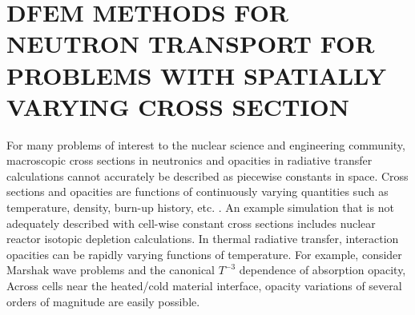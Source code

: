 %
%
%



\chapter{\uppercase{DFEM Methods for Neutron Transport for Problems with Spatially Varying Cross Section}}
\label{sec:chapter3_variable_xs}

For many problems of interest to the nuclear science and engineering community, macroscopic cross sections in neutronics and opacities in radiative transfer calculations cannot accurately be described as piecewise constants in space.  
Cross sections and opacities are functions of continuously varying quantities such as temperature, density, burn-up history, etc. \cite{xs_are_T_dependent}.
An example simulation that is not adequately described with cell-wise constant cross sections includes nuclear reactor isotopic depletion calculations.
In thermal radiative transfer, interaction opacities can be rapidly varying functions of temperature.  
For example, consider Marshak wave problems and the canonical $T^{-3}$ dependence \cite{ober_shadid} of absorption opacity, 
Across cells near the heated/cold material interface, opacity variations of several orders of magnitude are easily possible.

